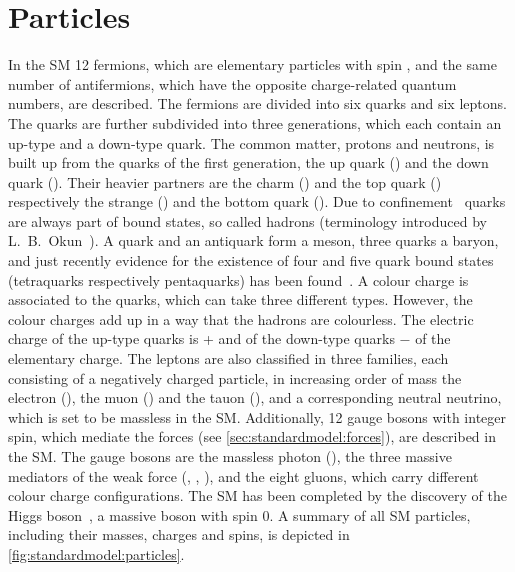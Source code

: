 
\section{Particles}
\label{sec:standardmodel:particles}

In the SM 12 fermions, which are elementary particles with spin ,
and the same number of antifermions, which have the opposite charge-related
quantum numbers, are described. The fermions are divided into six quarks and
six leptons. The quarks are further subdivided into three generations, which
each contain an up-type and a down-type quark. The common matter, protons and
neutrons, is built up from the quarks of the first generation, the up quark
(\uquark) and the down quark (\dquark). Their heavier partners are the charm
(\cquark) and the top quark (\tquark) respectively the strange (\squark) and
the bottom quark (\bquark). Due to confinement~\cite{Confinement} quarks are
always part of bound states, so called hadrons (terminology introduced by
L.~B.~Okun~\cite{Okun:1962kca}). A quark and an antiquark form a meson, three
quarks a baryon, and just recently evidence for the existence of four and five
quark bound states (tetraquarks respectively pentaquarks) has been
found~\cite{LHCb-PAPER-2016-018,*LHCb-PAPER-2016-019,LHCb-PAPER-2015-029,LHCb-PAPER-2016-015}.
A colour charge is associated to the quarks, which can take three different
types. However, the colour charges add up in a way that the hadrons are
colourless. The electric charge of the up-type quarks is + and of
the down-type quarks $-$ of the elementary charge. The leptons are
also classified in three families, each consisting of a negatively charged
particle, in increasing order of mass the electron (\electron), the muon
(\muon) and the tauon (\tauon), and a corresponding neutral neutrino, which is
set to be massless in the SM. Additionally, 12 gauge bosons with integer spin,
which mediate the forces (see \cref{sec:standardmodel:forces}), are described
in the SM. The gauge bosons are the massless photon (\g), the three massive
mediators of the weak force (\Wp, \Wm, \Z), and the eight gluons, which carry
different colour charge configurations. The SM has been completed by the
discovery of the Higgs boson~\cite{Higgs-Atlas,Higgs-CMS}, a massive boson
with spin 0. A summary of all SM particles, including their masses, charges
and spins, is depicted in \cref{fig:standardmodel:particles}.
